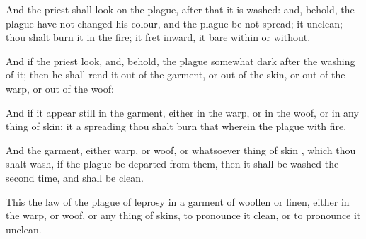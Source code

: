 {And the
priest shall
look on the
plague,
after that it is
washed: and, behold,
{} the
plague have not
changed his
colour, and the
plague be not
spread; it
{}
unclean; thou shalt
burn it in the
fire; it
{}
fret inward,
{} it
{} bare
within or
without.

And if the
priest
look, and, behold, the
plague
{} somewhat
dark
after the
washing of it; then he shall
rend it out of the
garment, or out of the
skin, or out of the
warp, or out of the
woof:

And if it
appear
still in the
garment, either in the
warp, or in the
woof, or in any
thing of
skin; it
{} a
spreading
{} thou shalt
burn that wherein the
plague
{} with
fire.

And the
garment, either
warp, or
woof, or whatsoever
thing of
skin
{}, which thou shalt
wash, if the
plague be
departed from them, then it shall be
washed the
second time, and shall be
clean.

This
{} the
law of the
plague of
leprosy in a
garment of
woollen or
linen, either in the
warp, or
woof, or any
thing of
skins, to pronounce it
clean, or to pronounce it
unclean.




\par }

